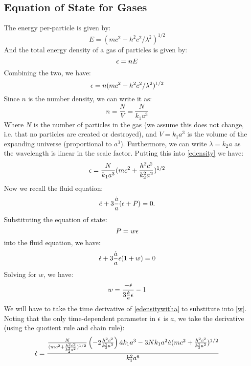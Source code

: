 \subsection{Equation of State for Gases}
The energy per-particle is given by:
\begin{equation}
    E = (mc^2 + h^2c^2/\lambda^2)^{1/2}
\end{equation}
And the total energy density of a gas of particles is given by:
\begin{equation}
    \epsilon = nE
\end{equation}
Combining the two, we have:
\begin{equation}\label{edensity}
    \epsilon = n(mc^2 + h^2c^2/\lambda^2)^{1/2}
\end{equation}
Since $n$ is the number density, we can write it as:
\begin{equation}
    n = \frac{N}{V} = \frac{N}{k_1 a^3}
\end{equation}
Where $N$ is the number of particles in the gas (we assume this does not change, i.e. that no particles are created or destroyed), and $V = k_1 a^3$ is the volume of the expanding universe (proportional to $a^3$). Furthermore, we can write $\lambda = k_2 a$ as the wavelength is linear in the scale factor. Putting this into \eqref{edensity} we have:
\begin{equation}\label{edensitywitha}
    \epsilon = \frac{N}{k_1 a^3}(mc^2 + \frac{h^2c^2}{k_2^2 a^2})^{1/2}
\end{equation}
Now we recall the fluid equation:
\begin{equation}
    \dot{e} + 3\frac{\dot{a}}{a}(\epsilon + P) = 0.
\end{equation}
Substituting the equation of state:
\begin{equation}
    P = w\epsilon
\end{equation}
into the fluid equation, we have:
\begin{equation}
    \dot{\epsilon} + 3\frac{\dot{a}}{a}\epsilon(1 + w) = 0 
\end{equation}
Solving for $w$, we have:
\begin{equation}\label{w}
    w = \frac{-\dot{\epsilon}}{3\frac{\dot{a}}{a}\epsilon} - 1
\end{equation}
We will have to take the time derivative of \eqref{edensitywitha} to substitute into \eqref{w}. Noting that the only time-dependent parameter in $\epsilon$ is $a$, we take the derivative (using the quotient rule and chain rule):
\begin{equation}
    \dot{\epsilon} = \frac{\frac{N}{(mc^2 + \frac{h^2c^2}{k_2^2 a^2})^{1/2}}\left(-2\frac{h^2c^2}{k_2^2a^3}\right)\dot{a}k_1a^3 - 3Nk_1 a^2 \dot{a}(mc^2 + \frac{h^2c^2}{k_2^2 a^2})^{1/2}}{k_1^2 a^6}
\end{equation}
